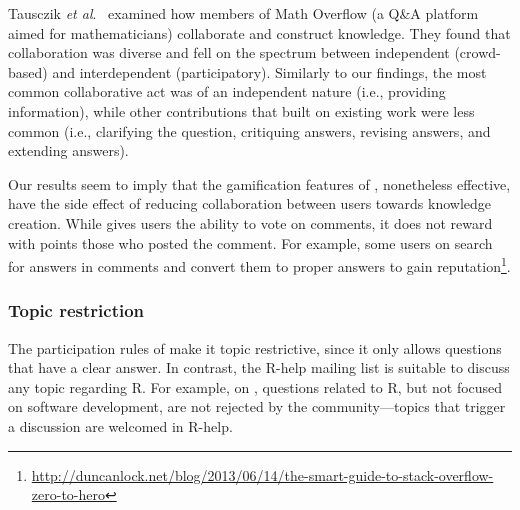 Tausczik \textit{et al}.~\cite{Tausczik2014} examined how members of Math Overflow (a Q\&A platform aimed for mathematicians) collaborate and construct knowledge. They found that collaboration was diverse and fell on the spectrum between independent (crowd-based) and interdependent (participatory). Similarly to our findings, the most common collaborative act was of an independent nature (i.e., providing information), while other contributions that built on existing work were less common (i.e., clarifying the question, critiquing answers, revising answers, and extending answers).

Our results seem to imply that the gamification features of \SO, nonetheless effective, have the side effect of reducing collaboration between users towards knowledge creation. While \SO gives users the ability to vote on comments, it does not reward with points those who posted the comment. For example, some users on \SO search for answers in comments and convert them to proper answers to gain reputation\footnote{\url{http://duncanlock.net/blog/2013/06/14/the-smart-guide-to-stack-overflow-zero-to-hero}}.


\subsubsection{Topic restriction}

The participation rules of \SO make it topic restrictive, since it only allows questions that have a clear answer. In contrast, the R-help mailing list is suitable to discuss
any topic regarding R. For example, on \RH, questions related to R, but not focused on software development, are not rejected by the community---topics that trigger a discussion are welcomed in R-help. 

